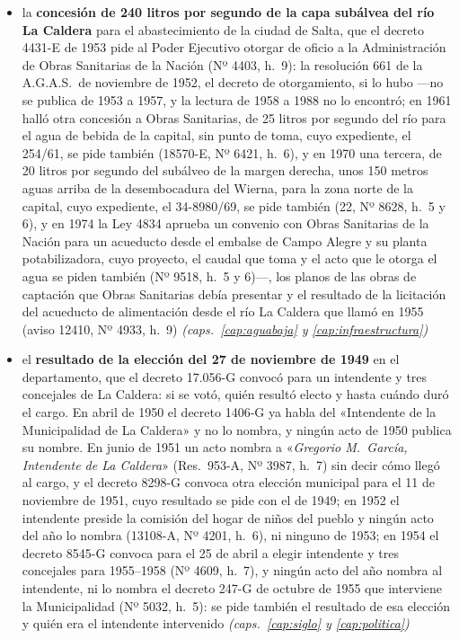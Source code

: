 \begin{itemize}[leftmargin=*]
\item la \textbf{concesión de 240 litros por segundo de la capa subálvea del río La Caldera} para el abastecimiento de la ciudad de Salta, que el decreto 4431-E de 1953 pide al Poder Ejecutivo otorgar de oficio a la Administración de Obras Sanitarias de la Nación (Nº 4403, h.\ 9): la resolución 661 de la A.G.A.S.\ de noviembre de 1952, el decreto de otorgamiento, si lo hubo ---no se publica de 1953 a 1957, y la lectura de 1958 a 1988 no lo encontró; en 1961 halló otra concesión a Obras Sanitarias, de 25 litros por segundo del río para el agua de bebida de la capital, sin punto de toma, cuyo expediente, el 254/61, se pide también (18570-E, Nº 6421, h.\ 6), y en 1970 una tercera, de 20 litros por segundo del subálveo de la margen derecha, unos 150 metros aguas arriba de la desembocadura del Wierna, para la zona norte de la capital, cuyo expediente, el 34-8980/69, se pide también (22, Nº 8628, h.\ 5 y 6), y en 1974 la Ley 4834 aprueba un convenio con Obras Sanitarias de la Nación para un acueducto desde el embalse de Campo Alegre y su planta potabilizadora, cuyo proyecto, el caudal que toma y el acto que le otorga el agua se piden también (Nº 9518, h.\ 5 y 6)---, los planos de las obras de captación que Obras Sanitarias debía presentar y el resultado de la licitación del acueducto de alimentación desde el río La Caldera que llamó en 1955 (aviso 12410, Nº 4933, h.\ 9) \textit{(caps.\ \ref{cap:aguabaja} y \ref{cap:infraestructura})}
\item el \textbf{resultado de la elección del 27 de noviembre de 1949} en el departamento, que el decreto 17.056-G convocó para un intendente y tres concejales de La Caldera: si se votó, quién resultó electo y hasta cuándo duró el cargo. En abril de 1950 el decreto 1406-G ya habla del «Intendente de la Municipalidad de La Caldera» y no lo nombra, y ningún acto de 1950 publica su nombre. En junio de 1951 un acto nombra a «\textit{Gregorio M.\ García, Intendente de La Caldera}» (Res.\ 953-A, Nº 3987, h.\ 7) sin decir cómo llegó al cargo, y el decreto 8298-G convoca otra elección municipal para el 11 de noviembre de 1951, cuyo resultado se pide con el de 1949; en 1952 el intendente preside la comisión del hogar de niños del pueblo y ningún acto del año lo nombra (13108-A, Nº 4201, h.\ 6), ni ninguno de 1953; en 1954 el decreto 8545-G convoca para el 25 de abril a elegir intendente y tres concejales para 1955--1958 (Nº 4609, h.\ 7), y ningún acto del año nombra al intendente, ni lo nombra el decreto 247-G de octubre de 1955 que interviene la Municipalidad (Nº 5032, h.\ 5): se pide también el resultado de esa elección y quién era el intendente intervenido \textit{(caps.\ \ref{cap:siglo} y \ref{cap:politica})}

\end{itemize}
